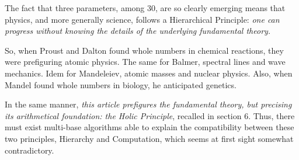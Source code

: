 \documentclass[twoside,draft]{article}
\begin{document}
\begin{sloppypar}
The fact that three parameters, among 30, are so clearly emerging means that physics, and more generally science, follows a Hierarchical Principle: \textit{one can progress without knowing the details of the underlying fundamental theory.}

So, when Proust and Dalton found whole numbers in chemical reactions, they were prefiguring atomic physics. The same for Balmer, spectral lines and wave mechanics. Idem for Mandeleiev, atomic masses and nuclear physics. Also, when Mandel found whole numbers in biology, he anticipated genetics. 

In the same manner, \textit{this article prefigures the fundamental theory, but precising its arithmetical foundation: the Holic Principle}, recalled in section 6. Thus, there must exist multi-base algorithms able to explain the compatibility between these two principles, Hierarchy and Computation, which seems at first sight somewhat contradictory. 



\end{sloppypar}
\end{document}
